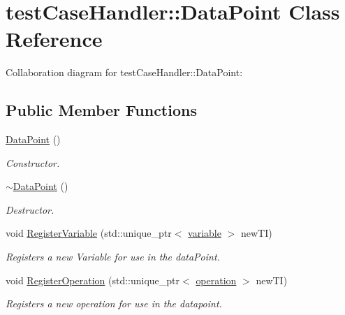 \hypertarget{classtestCaseHandler_1_1DataPoint}{}\section{test\+Case\+Handler\+::Data\+Point Class Reference}
\label{classtestCaseHandler_1_1DataPoint}


Collaboration diagram for test\+Case\+Handler\+::Data\+Point\+:
\subsection*{Public Member Functions}
\begin{DoxyCompactItemize}
\item 
\mbox{\label{classtestCaseHandler_1_1DataPoint_a34277c690d8c57df20596f78f26f686c}} 
\mbox{\hyperlink{classtestCaseHandler_1_1DataPoint_a34277c690d8c57df20596f78f26f686c}{Data\+Point}} ()
\begin{DoxyCompactList}\small\item\em Constructor. \end{DoxyCompactList}\item 
\mbox{\label{classtestCaseHandler_1_1DataPoint_ae3f18c692bbf36b2df3b4d134a42b8a6}} 
\mbox{\hyperlink{classtestCaseHandler_1_1DataPoint_ae3f18c692bbf36b2df3b4d134a42b8a6}{$\sim$\+Data\+Point}} ()
\begin{DoxyCompactList}\small\item\em Destructor. \end{DoxyCompactList}\item 
void \mbox{\hyperlink{classtestCaseHandler_1_1DataPoint_a9eac56ca6d3b6054688444f3f7a416a5}{Register\+Variable}} (std\+::unique\+\_\+ptr$<$ \mbox{\hyperlink{classtestCaseHandler_1_1variable}{variable}} $>$ new\+TI)
\begin{DoxyCompactList}\small\item\em Registers a new Variable for use in the data\+Point. \end{DoxyCompactList}\item 
void \mbox{\hyperlink{classtestCaseHandler_1_1DataPoint_affedda74a9c4cfc4ddc4aaab8cb92c05}{Register\+Operation}} (std\+::unique\+\_\+ptr$<$ \mbox{\hyperlink{classtestCaseHandler_1_1operation}{operation}} $>$ new\+TI)
\begin{DoxyCompactList}\small\item\em Registers a new operation for use in the datapoint. \end{DoxyCompactList}\item 

\end{DoxyCompactItemize}
